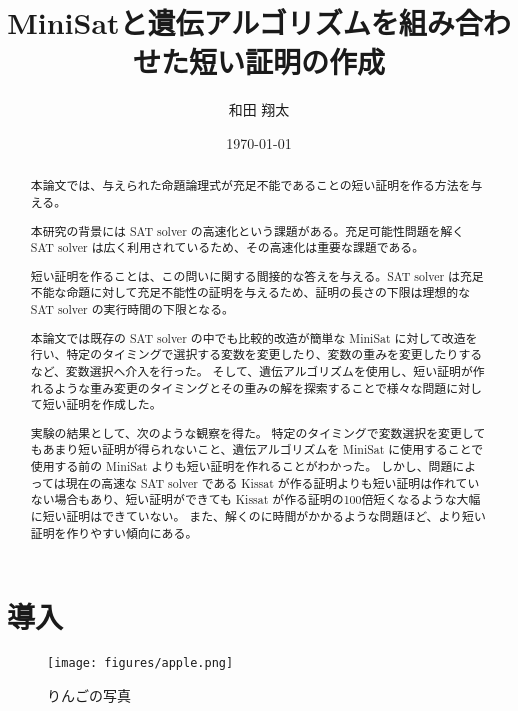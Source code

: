 \documentclass[titlepage]{jsarticle}
\title{MiniSatと遺伝アルゴリズムを組み合わせた短い証明の作成}
\author{和田 翔太}
\date{\today}
\begin{document}
\maketitle





\begin{abstract}
	本論文では、与えられた命題論理式が充足不能であることの短い証明を作る方法を与える。

	本研究の背景には SAT solver の高速化という課題がある。充足可能性問題を解く SAT solver は広く利用されているため、その高速化は重要な課題である。

	短い証明を作ることは、この問いに関する間接的な答えを与える。SAT solver は充足不能な命題に対して充足不能性の証明を与えるため、証明の長さの下限は理想的な SAT solver の実行時間の下限となる。 

	本論文では既存の SAT solver の中でも比較的改造が簡単な MiniSat に対して改造を行い、特定のタイミングで選択する変数を変更したり、変数の重みを変更したりするなど、変数選択へ介入を行った。
	そして、遺伝アルゴリズムを使用し、短い証明が作れるような重み変更のタイミングとその重みの解を探索することで様々な問題に対して短い証明を作成した。

	実験の結果として、次のような観察を得た。
	特定のタイミングで変数選択を変更してもあまり短い証明が得られないこと、遺伝アルゴリズムを MiniSat に使用することで使用する前の MiniSat よりも短い証明を作れることがわかった。
	しかし、問題によっては現在の高速な SAT solver である Kissat が作る証明よりも短い証明は作れていない場合もあり、短い証明ができても Kissat が作る証明の100倍短くなるような大幅に短い証明はできていない。
	また、解くのに時間がかかるような問題ほど、より短い証明を作りやすい傾向にある。
\end{abstract}
















\section{導入}

\begin{figure}[t]
 	\texttt{[image: figures/apple.png]}
	\caption{りんごの写真}
\end{figure}
\end{document}
